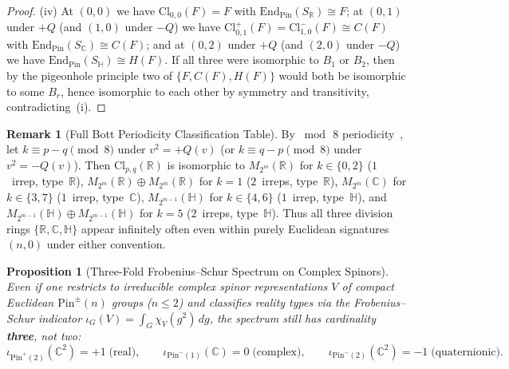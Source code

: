 \documentclass[11pt,a4paper]{article}
\theoremstyle{plain}
\newtheorem{proposition}[theorem]{Proposition}
\theoremstyle{definition}
\newtheorem{remark}[theorem]{Remark}
\newcommand{\Cl}{\mathrm{Cl}}
\newcommand{\Pin}{\mathrm{Pin}}
\newcommand{\End}{\mathrm{End}}
\newcommand{\R}{\mathbb{R}}
\newcommand{\C}{\mathbb{C}}
\newcommand{\HH}{\mathbb{H}}
\begin{document}
\begin{proof}
(iv) At $(0,0)$ we have $\Cl_{0,0}(F) = F$ with $\End_{\Pin}(S_{\R}) \cong F$; at $(0,1)$ under $+Q$ (and $(1,0)$ under $-Q$) we have $\Cl_{0,1}^+(F) = \Cl_{1,0}^-(F) \cong C(F)$ with $\End_{\Pin}(S_{\C}) \cong C(F)$; and at $(0,2)$ under $+Q$ (and $(2,0)$ under $-Q$) we have $\End_{\Pin}(S_{\HH}) \cong H(F)$. If all three were isomorphic to $B_1$ or $B_2$, then by the pigeonhole principle two of $\{F, C(F), H(F)\}$ would both be isomorphic to some $B_r$, hence isomorphic to each other by symmetry and transitivity, contradicting~(i).
\end{proof}

\begin{remark}[Full Bott Periodicity Classification Table]
By $\bmod\,8$ periodicity~\cite{ABS64,LM89}, let $k \equiv p - q \pmod 8$ under $v^2 = +Q(v)$ (or $k \equiv q - p \pmod 8$ under $v^2 = -Q(v)$). Then $\Cl_{p,q}(\R)$ is isomorphic to $M_{2^m}(\R)$ for $k \in \{0,2\}$ ($1$~irrep, type~$\R$), $M_{2^m}(\R) \oplus M_{2^m}(\R)$ for $k = 1$ ($2$~irreps, type~$\R$), $M_{2^m}(\C)$ for $k \in \{3,7\}$ ($1$~irrep, type~$\C$), $M_{2^{m-1}}(\HH)$ for $k \in \{4,6\}$ ($1$~irrep, type~$\HH$), and $M_{2^{m-1}}(\HH) \oplus M_{2^{m-1}}(\HH)$ for $k = 5$ ($2$~irreps, type~$\HH$). Thus all three division rings $\{\R, \C, \HH\}$ appear infinitely often even within purely Euclidean signatures $(n,0)$ under either convention.
\end{remark}

\begin{proposition}[Three-Fold Frobenius--Schur Spectrum on Complex Spinors]
\label{prop:fs-indicator}
Even if one restricts to irreducible \emph{complex} spinor representations $V$ of compact Euclidean $\Pin^\pm(n)$ groups ($n \le 2$) and classifies reality types via the Frobenius--Schur indicator $\iota_G(V) = \int_G \chi_V(g^2)\,dg$, the spectrum still has cardinality \textbf{three}, not two:
\[
  \iota_{\Pin^+(2)}(\C^2) = +1 \;\text{(real)}, \qquad
  \iota_{\Pin^-(1)}(\C) = 0 \;\text{(complex)}, \qquad
  \iota_{\Pin^-(2)}(\C^2) = -1 \;\text{(quaternionic)}.
\]
\end{proposition}
\end{document}
